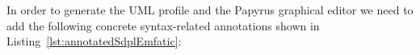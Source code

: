 In order to generate the UML profile and the Papyrus graphical editor we need to add the following concrete syntax-related annotations shown in Listing~\ref{lst:annotatedSdplEmfatic}:

\begin{figure}[ht!]
	
	\vspace*{-5mm}
\end{figure}

